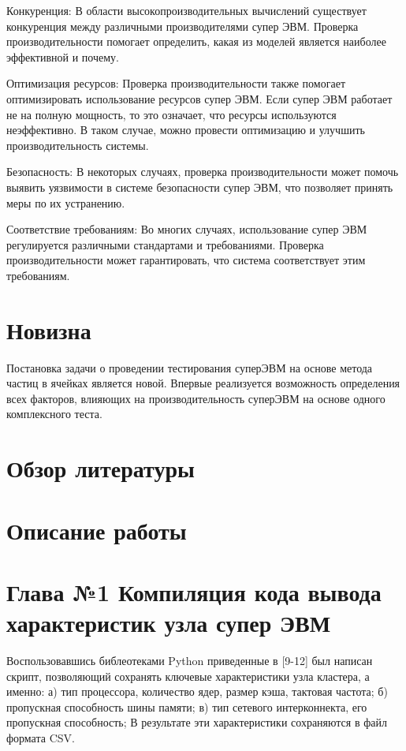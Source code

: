 \documentclass{article}
\begin{document}
Конкуренция: В области высокопроизводительных вычислений существует конкуренция между различными производителями супер ЭВМ. Проверка производительности помогает определить, какая из моделей является наиболее эффективной и почему.

Оптимизация ресурсов: Проверка производительности также помогает оптимизировать использование ресурсов супер ЭВМ. Если супер ЭВМ работает не на полную 
мощность, то это означает, что ресурсы используются неэффективно. В таком случае, можно провести оптимизацию и улучшить производительность системы.

Безопасность: В некоторых случаях, проверка производительности может помочь выявить уязвимости в системе безопасности супер ЭВМ, что позволяет принять меры по их устранению.

Соответствие требованиям: Во многих случаях, использование супер ЭВМ регулируется различными стандартами и требованиями. Проверка производительности может гарантировать, что система соответствует этим требованиям.

\section{Новизна}
Постановка задачи о проведении тестирования суперЭВМ на основе метода частиц в ячейках является новой. Впервые реализуется возможность определения всех факторов, влияющих на производительность суперЭВМ на основе одного комплексного теста.

\section{Обзор литературы}

\section{Описание работы}

\section{Глава №1 Компиляция кода вывода характеристик узла супер ЭВМ}
Воспользовавшись библеотеками Python приведенные в [9-12] был написан скрипт, позволяющий сохранять ключевые характеристики узла кластера, а именно:
а) тип процессора, количество ядер, размер кэша, тактовая частота;
б) пропускная способность шины памяти;
в) тип сетевого интерконнекта, его пропускная способность;
В результате эти характеристики сохраняются в файл формата CSV.
\end{document}
